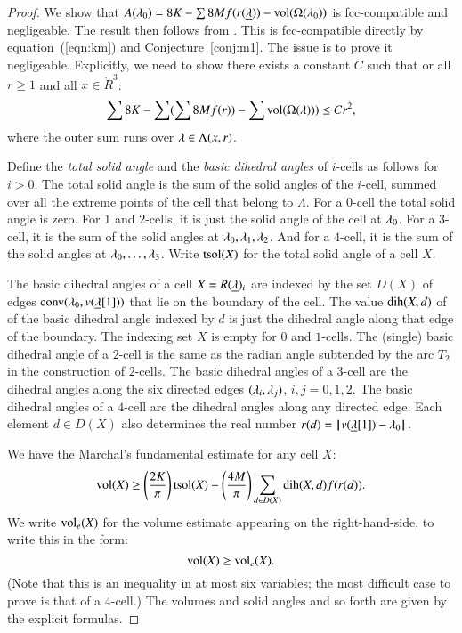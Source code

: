 \begin{proof} 
We show that $A(\lambda_0)  = 8 K - \sum 8 M f(r({\underline{\lambda}})) -{\operatorname{vol}}(\Omega(\lambda_0))$ is fcc-compatible and negligeable.  The
result then follows from \cite[Lemma~3.3]{Hales:2006:DCG}.  This is fcc-compatible directly
by equation~(\ref{eqn:km})
and Conjecture~\ref{conj:m1}.  The issue is to prove it negligeable.  Explicitly, we need
to show there exists a constant  $C$ such that or all $r\ge 1$ and all $x\in\ring{R}^3$:
\begin{equation}\label{eqn:neg}
\sum 8K - \sum (\sum 8 M f(r)) - \sum {\operatorname{vol}}(\Omega(\lambda))) \le C r^2,
\end{equation}
where the outer sum runs over $\lambda\in \Lambda(x,r)$.


Define the {\it total solid angle} and the {\it basic dihedral angles} of $i$-cells as follows for
$i>0$.  The total solid angle is the sum of the solid angles of the $i$-cell, summed
over all the extreme points of the cell that belong to $\Lambda$.  For a $0$-cell
the total solid angle is zero. For $1$ and $2$-cells,
it is just the solid angle of the cell at $\lambda_0$.  For a $3$-cell, it is the sum of the
solid angles at $\lambda_0,\lambda_1,\lambda_2$.  And for a $4$-cell, it is the sum of the solid
angles at $\lambda_0,\ldots,\lambda_3$. Write ${\operatorname{tsol}}(X)$ for the total solid angle of a cell $X$.


The  basic dihedral angles of a cell $X = R({\underline{\lambda}})_i$ are indexed by the set $D(X)$ of
edges ${\operatorname{conv}}(\lambda_0,v({\underline{\lambda}}[1]))$ that lie on the boundary of the cell.  The value
$\operatorname{dih}(X,d)$ of
of the basic dihedral angle indexed by $d$ is just the dihedral angle along that edge
of the boundary.  The indexing set $X$ is empty for  $0$ and $1$-cells.
The (single) basic  dihedral angle of a $2$-cell is
the same as the radian angle subtended by the arc $T_2$ in the construction of $2$-cells.
The basic dihedral angles of a $3$-cell are the dihedral angles along the
six directed edges $(\lambda_i,\lambda_j)$, $i,j=0,1,2$.  The basic dihedral angles of a $4$-cell are
the dihedral angles along any directed edge.  Each element $d\in D(X)$ also determines
the real number $r(d) = {\hskip0.1em|\hskip-0.15em|\hskip0.1em}v({\underline{\lambda}}[1]) - \lambda_0{\hskip0.1em|\hskip-0.15em|\hskip0.1em}$.

We have the Marchal's fundamental estimate for any cell $X$:
\begin{equation}\label{eqn:mfe}
{\operatorname{vol}}(X) \ge \left(\frac{2K}{\pi}\right) {\operatorname{tsol}}(X) - \left(\frac{4M}{\pi}\right)
\sum_{d\in D(X)} \operatorname{dih}(X,d) f(r(d)).
\end{equation}
We write ${\operatorname{vol}}_e(X)$ for the volume estimate appearing on the 
right-hand-side, to write this in the form:
\begin{equation}\label{eqn:vole}
{\operatorname{vol}}(X) \ge {\operatorname{vol}}_e(X).
\end{equation}
(Note that this is an inequality in at most six variables; the most difficult case to prove
is that of a $4$-cell.)  The volumes and solid angles and so forth are given by the 
explicit formulas.


\end{proof}
